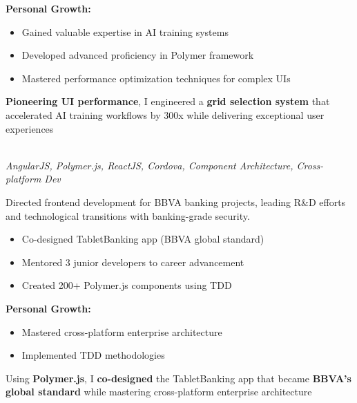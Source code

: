 \documentclass[a4paper,10pt]{article}
\newcommand{\experiencebreak}{\needspace{18\baselineskip}}
\begin{document}
\vspace{0.2cm}
\textbf{Personal Growth:}
\vspace{0.2cm}
\begin{itemize}[label=\textcolor{darkblue}{\textbullet}, leftmargin=*, nosep]
	\item Gained valuable expertise in AI training systems
	\item Developed advanced proficiency in Polymer framework
	\item Mastered performance optimization techniques for complex UIs
\end{itemize}

\vspace{0.2cm}

\textbf{Pioneering UI performance}, I engineered a \textbf{grid selection system} that accelerated AI training workflows by 300x while delivering exceptional user experiences

\vspace{0.4cm}

\experiencebreak
\noindent\uline{} \\
\vspace{0cm} \hspace{0.2cm}
{\small\textit{AngularJS, Polymer.js, ReactJS, Cordova, Component Architecture, Cross-platform Dev}}

Directed frontend development for BBVA banking projects, leading R\&D efforts and technological transitions with banking-grade security.

\begin{itemize}[label=\textcolor{darkblue}{\textbullet}, leftmargin=*, nosep]
	\item Co-designed TabletBanking app (BBVA global standard)
	\item Mentored 3 junior developers to career advancement
	\item Created 200+ Polymer.js components using TDD
\end{itemize}

\textbf{Personal Growth:}
\begin{itemize}[label=\textcolor{darkblue}{\textbullet}, leftmargin=*, nosep]
	\item Mastered cross-platform enterprise architecture
	\item Implemented TDD methodologies
\end{itemize}

Using \textbf{Polymer.js}, I \textbf{co-designed} the TabletBanking app that became \textbf{BBVA's global standard} while mastering cross-platform enterprise architecture
\end{document}
